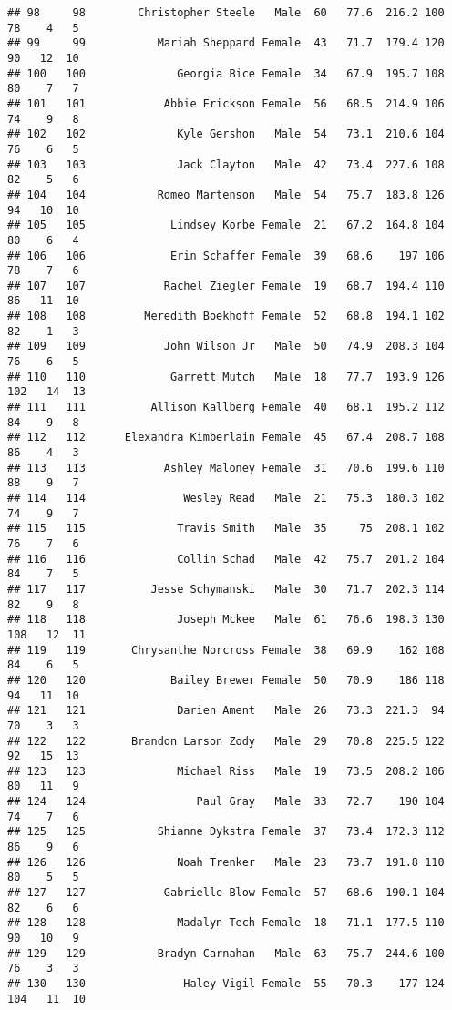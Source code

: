 \documentclass[
]{article}
\begin{document}
\begin{verbatim}
## 98     98        Christopher Steele   Male  60   77.6  216.2 100  78    4   5
## 99     99           Mariah Sheppard Female  43   71.7  179.4 120  90   12  10
## 100   100              Georgia Bice Female  34   67.9  195.7 108  80    7   7
## 101   101            Abbie Erickson Female  56   68.5  214.9 106  74    9   8
## 102   102              Kyle Gershon   Male  54   73.1  210.6 104  76    6   5
## 103   103              Jack Clayton   Male  42   73.4  227.6 108  82    5   6
## 104   104           Romeo Martenson   Male  54   75.7  183.8 126  94   10  10
## 105   105             Lindsey Korbe Female  21   67.2  164.8 104  80    6   4
## 106   106             Erin Schaffer Female  39   68.6    197 106  78    7   6
## 107   107            Rachel Ziegler Female  19   68.7  194.4 110  86   11  10
## 108   108         Meredith Boekhoff Female  52   68.8  194.1 102  82    1   3
## 109   109            John Wilson Jr   Male  50   74.9  208.3 104  76    6   5
## 110   110             Garrett Mutch   Male  18   77.7  193.9 126 102   14  13
## 111   111          Allison Kallberg Female  40   68.1  195.2 112  84    9   8
## 112   112      Elexandra Kimberlain Female  45   67.4  208.7 108  86    4   3
## 113   113            Ashley Maloney Female  31   70.6  199.6 110  88    9   7
## 114   114               Wesley Read   Male  21   75.3  180.3 102  74    9   7
## 115   115              Travis Smith   Male  35     75  208.1 102  76    7   6
## 116   116              Collin Schad   Male  42   75.7  201.2 104  84    7   5
## 117   117          Jesse Schymanski   Male  30   71.7  202.3 114  82    9   8
## 118   118              Joseph Mckee   Male  61   76.6  198.3 130 108   12  11
## 119   119       Chrysanthe Norcross Female  38   69.9    162 108  84    6   5
## 120   120             Bailey Brewer Female  50   70.9    186 118  94   11  10
## 121   121              Darien Ament   Male  26   73.3  221.3  94  70    3   3
## 122   122       Brandon Larson Zody   Male  29   70.8  225.5 122  92   15  13
## 123   123              Michael Riss   Male  19   73.5  208.2 106  80   11   9
## 124   124                 Paul Gray   Male  33   72.7    190 104  74    7   6
## 125   125           Shianne Dykstra Female  37   73.4  172.3 112  86    9   6
## 126   126              Noah Trenker   Male  23   73.7  191.8 110  80    5   5
## 127   127            Gabrielle Blow Female  57   68.6  190.1 104  82    6   6
## 128   128              Madalyn Tech Female  18   71.1  177.5 110  90   10   9
## 129   129           Bradyn Carnahan   Male  63   75.7  244.6 100  76    3   3
## 130   130               Haley Vigil Female  55   70.3    177 124 104   11  10

\end{verbatim}
\end{document}
